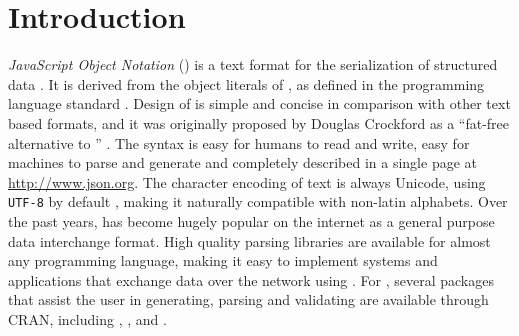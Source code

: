 







\section{Introduction}

\emph{JavaScript Object Notation} (\JSON) is a text format for the serialization of structured data \citep{crockford2006application}. It is derived from the object literals of , as defined in the  programming language standard \citep{ecma1999262}. Design of \JSON is simple and concise in comparison with other text based formats, and it was originally proposed by Douglas Crockford as a ``fat-free alternative to \XML'' \citep{crockford2006json}. The syntax is easy for humans to read and write, easy for machines to parse and generate and completely described in a single page at \url{http://www.json.org}. The character encoding of \JSON text is always Unicode, using \texttt{UTF-8} by default \citep{crockford2006application}, making it naturally compatible with non-latin alphabets. Over the past years, \JSON has become hugely popular on the internet as a general purpose data interchange format. High quality parsing libraries are available for almost any programming language, making it easy to implement systems and applications that exchange data over the network using \JSON. For \R \citep{R}, several packages that assist the user in generating, parsing and validating \JSON are available through CRAN, including  \citep{rjson},  \citep{RJSONIO}, and  \citep{jsonlite}.

